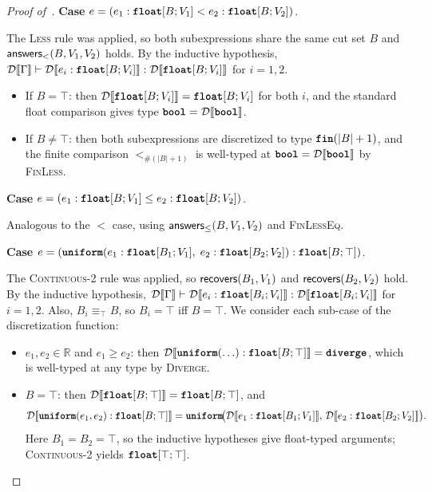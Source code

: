 \begin{proof}[Proof of~]
  \par\medskip\noindent
  \textbf{Case} $e = (e_1 : \float[B; V_1] < e_2 : \float[B; V_2])$.
  \par\nopagebreak
  The \textsc{Less} rule was applied, so both subexpressions share the same cut set $B$ and $\answerslt{B}{V_1}{V_2}$ holds. By the inductive hypothesis, $\discretize{\Gamma} \vdash \discretize{e_i : \float[B;V_i]} : \discretize{\float[B;V_i]}$ for $i = 1, 2$.
  \begin{itemize}[leftmargin=1.5em, itemsep=0.35em, topsep=0.35em]
      \item If $B = \top$: then $\discretize{\float[B;V_i]} = \float[B;V_i]$ for both $i$, and the standard float comparison gives type $\bool = \discretize{\bool}$.
      \item If $B \neq \top$: then both subexpressions are discretized to type $\fin{|B|+1}$, and the finite comparison $<_{\#(|B|+1)}$ is well-typed at $\bool = \discretize{\bool}$ by \textsc{FinLess}.
  \end{itemize}

  \par\medskip\noindent
  \textbf{Case} $e = (e_1 : \float[B; V_1] \leq e_2 : \float[B; V_2])$.
  \par\nopagebreak
  Analogous to the $<$ case, using $\answersleq{B}{V_1}{V_2}$ and \textsc{FinLessEq}.

  \par\medskip\noindent
  \textbf{Case} $e = (\uniform(e_1 : \float[B_1; V_1],\; e_2 : \float[B_2; V_2]) : \float[B; \top])$.
  \par\nopagebreak
  The \textsc{Continuous-2} rule was applied, so $\distinguishes{B_1}{V_1}$ and $\distinguishes{B_2}{V_2}$ hold. By the inductive hypothesis, $\discretize{\Gamma} \vdash \discretize{e_i : \float[B_i;V_i]} : \discretize{\float[B_i;V_i]}$ for $i = 1, 2$. Also, $B_i \equiv_{\top} B$, so $B_i=\top$ iff $B=\top$. We consider each sub-case of the discretization function:
  \begin{itemize}[leftmargin=1.5em, itemsep=0.5em, topsep=0.35em]
      \item $e_1, e_2 \in \mathbb{R}$ and $e_1 \geq e_2$: then $\discretize{\uniform(\ldots) : \float[B;\top]} = \diverge$, which is well-typed at any type by \textsc{Diverge}.
  
      \item $B = \top$: then $\discretize{\float[B;\top]} = \float[B;\top]$, and
      \[
          \discretize{\uniform(e_1, e_2) : \float[B;\top]} = \uniform\!\bigl(\discretize{e_1 : \float[B_1;V_1]},\, \discretize{e_2 : \float[B_2;V_2]}\bigr).
      \]
	      Here $B_1=B_2=\top$, so the inductive hypotheses give float-typed arguments; \textsc{Continuous-2} yields $\float[\top;\top]$.
  

\end{itemize}
\end{proof}

